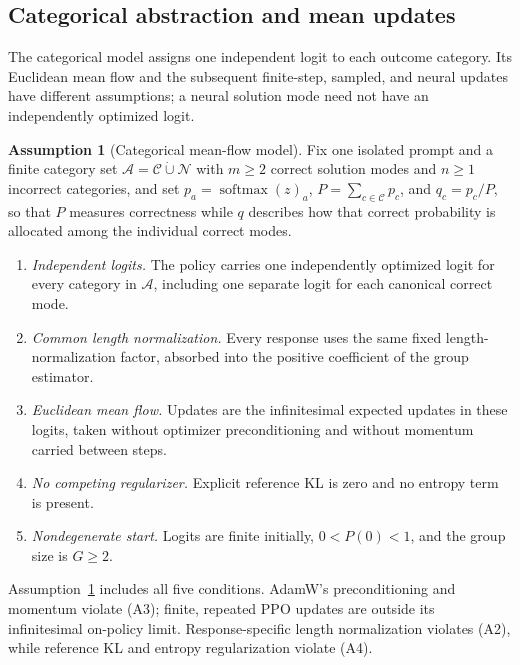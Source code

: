 \documentclass{article}
\newcommand{\1}{\mathbf 1}
\theoremstyle{remark}
\theoremstyle{definition}
\newtheorem{assumption}[lemma]{Assumption}
\theoremstyle{plain}
\begin{document}
\subsection{Categorical abstraction and mean updates}
\label{app:theory-grpo-mean}

The categorical model assigns one independent logit to each outcome
category. Its Euclidean mean flow and the subsequent finite-step, sampled,
and neural updates have different assumptions; a neural solution mode need
not have an independently optimized logit.

\begin{assumption}[Categorical mean-flow model]
\label{ass:categorical-mean-flow}
Fix one isolated prompt and a finite category set
$\mathcal A=\mathcal C\mathbin{\dot\cup}\mathcal N$ with $m\ge2$ correct
solution modes and $n\ge1$ incorrect categories, and set
$p_a=\operatorname{softmax}(z)_a$, $P=\sum_{c\in\mathcal C}p_c$, and
$q_c=p_c/P$, so that $P$ measures correctness while $q$ describes how that
correct probability is allocated among the individual correct modes.
\begin{enumerate}
\item[(A1)] \emph{Independent logits.} The policy carries one independently
  optimized logit for every category in $\mathcal A$, including one separate
  logit for each canonical correct mode.
\item[(A2)] \emph{Common length normalization.} Every response uses the same
  fixed length-normalization factor, absorbed into the positive coefficient
  of the group estimator.
\item[(A3)] \emph{Euclidean mean flow.} Updates are the infinitesimal expected
  updates in these logits, taken without optimizer preconditioning and without
  momentum carried between steps.
\item[(A4)] \emph{No competing regularizer.} Explicit reference KL is zero and
  no entropy term is present.
\item[(A5)] \emph{Nondegenerate start.} Logits are finite initially,
  $0<P(0)<1$, and the group size is $G\ge2$.
\end{enumerate}
\end{assumption}

Assumption~\ref{ass:categorical-mean-flow} includes all five conditions.
AdamW's preconditioning and momentum violate (A3); finite, repeated PPO
updates are outside its infinitesimal on-policy limit. Response-specific
length normalization violates (A2), while reference KL and entropy
regularization violate (A4).
\end{document}
